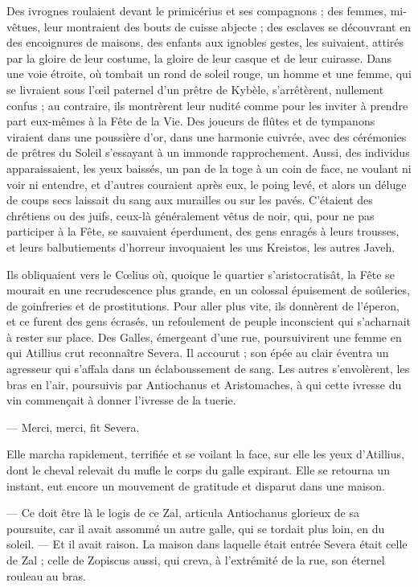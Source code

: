 \documentclass[a4paper, 11pt, oneside, polutonikogreek, french]{article}
\begin{document}
Des ivrognes roulaient devant le primicérius et ses compagnons ; des femmes, mi-vêtues, leur montraient des bouts de cuisse abjecte ; des esclaves se découvrant en des encoignures de maisons, des enfants aux ignobles gestes, les suivaient, attirés par la gloire de leur costume, la gloire de leur casque et de leur cuirasse. Dans une voie étroite, où tombait un rond de soleil rouge, un homme et une femme, qui se livraient sous l'œil paternel d'un prêtre de Kybèle, s'arrêtèrent, nullement confus ; au contraire, ils montrèrent leur nudité comme pour les inviter à prendre part eux-mêmes à la Fête de la Vie. Des joueurs de flûtes et de tympanons viraient dans une poussière d'or, dans une harmonie cuivrée, avec des cérémonies de prêtres du Soleil s'essayant à un immonde rapprochement. Aussi, des individus apparaissaient, les yeux baissés, un pan de la toge à un coin de face, ne voulant ni voir ni entendre, et d'autres couraient après eux, le poing levé, et alors un déluge de coups secs laissait du sang aux murailles ou sur les pavés. C'étaient des chrétiens ou des juifs, ceux-là généralement vêtus de noir, qui, pour ne pas participer à la Fête, se sauvaient éperdument, des gens enragés à leurs trousses, et leurs balbutiements d'horreur invoquaient les uns Kreistos, les autres Javeh.

Ils obliquaient vers le Cœlius où, quoique le quartier s'aristocratisât, la Fête se mourait en une recrudescence plus grande, en un colossal épuisement de soûleries, de goinfreries et de prostitutions. Pour aller plus vite, ils donnèrent de l'éperon, et ce furent des gens écrasés, un refoulement de peuple inconscient qui s'acharnait à rester sur place. Des Galles, émergeant d'une rue, poursuivirent une femme en qui Atillius crut reconnaître Severa. Il accourut ; son épée au clair éventra un agresseur qui s'affala dans un éclaboussement de sang. Les autres s'envolèrent, les bras en l'air, poursuivis par Antiochanus et Aristomaches, à qui cette ivresse du vin commençait à donner l'ivresse de la tuerie.

--- Merci, merci, fit Severa.

Elle marcha rapidement, terrifiée et se voilant la face, sur elle les yeux d'Atillius, dont le cheval relevait du mufle le corps du galle expirant. Elle se retourna un instant, eut encore un mouvement de gratitude et disparut dans une maison.

--- Ce doit être là le logis de ce Zal, articula Antiochanus glorieux de sa poursuite, car il avait assommé un autre galle, qui se tordait plus loin, en du soleil. --- Et il avait raison. La maison dans laquelle était entrée Severa était celle de Zal ; celle de Zopiscus aussi, qui creva, à l'extrémité de la rue, son éternel rouleau au bras.
\clearpage
\end{document}
